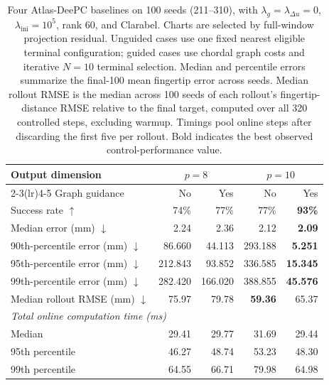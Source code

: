 \documentclass[10pt]{article}
\begin{document}
\begin{table}[htbp]
    \centering
    \small
    \begin{tabular}{lrrrr}
        \toprule
        Output dimension & \multicolumn{2}{c}{$p=8$} & \multicolumn{2}{c}{$p=10$} \\
        \cmidrule(lr){2-3}\cmidrule(lr){4-5}
        Graph guidance & No & Yes & No & Yes \\
        \midrule
        Success rate $\uparrow$ & 74\% & 77\% & 77\% & \textbf{93\%} \\
        Median error (mm) $\downarrow$ & 2.24 & 2.36 & 2.12 & \textbf{2.09} \\
        90th-percentile error (mm) $\downarrow$ & 86.660 & 44.113 & 293.188 & \textbf{5.251} \\
        95th-percentile error (mm) $\downarrow$ & 212.843 & 93.852 & 336.585 & \textbf{15.345} \\
        99th-percentile error (mm) $\downarrow$ & 282.420 & 166.020 & 388.855 & \textbf{45.576} \\
        Median rollout RMSE (mm) $\downarrow$ & 75.97 & 79.78 & \textbf{59.36} & 65.37 \\
        \midrule
        \multicolumn{5}{l}{\textit{Total online computation time (ms)}} \\
        Median & 29.41 & 29.77 & 31.69 & 29.44 \\
        95th percentile & 46.27 & 48.74 & 53.23 & 48.30 \\
        99th percentile & 64.55 & 66.71 & 79.98 & 64.98 \\
        \bottomrule
    \end{tabular}
    \caption{Four Atlas-DeePC baselines on 100 seeds (211--310), with
    $\lambda_g=\lambda_{\Delta u}=0$, $\lambda_{\mathrm{ini}}=10^5$, rank 60,
    and Clarabel. Charts are selected by full-window projection residual.
    Unguided cases use one fixed nearest eligible terminal configuration;
    guided cases use chordal graph costs and iterative $N=10$ terminal selection.
    Median and percentile errors summarize the final-100 mean fingertip error
    across seeds. Median rollout RMSE is the median across 100 seeds of
    each rollout's fingertip-distance RMSE relative to the final target,
    computed over all 320 controlled steps, excluding warmup.
    Timings pool online steps after discarding the first
    five per rollout. Bold indicates the best observed control-performance value.}
    \label{tab:four-baselines-no-input-smoothing}
\end{table}
\end{document}
